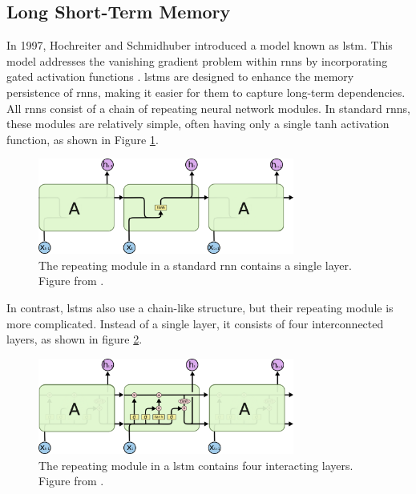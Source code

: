 \subsection{Long Short-Term Memory}
\label{sub:LSTM}

In 1997, Hochreiter and Schmidhuber introduced a model known as \gls{lstm}. This model addresses the vanishing gradient problem within \glspl{rnn} by incorporating gated activation functions \citep{hochreiter1997long}.
\newline
\newline
\glspl{lstm} are designed to enhance the memory persistence of \glspl{rnn}, making it easier for them to capture long-term dependencies. All \glspl{rnn} consist of a chain of repeating neural network modules. In standard \glspl{rnn}, these modules are relatively simple, often having only a single \gls{tanh} activation function, as shown in Figure \ref{fig:repeating_modules_rnn}.

\begin{figure}[ht]
    \centering
    \includegraphics[width=0.75\textwidth]{./assets/img/repeating_modules_rnn.png}
    \caption{The repeating module in a standard \gls{rnn} contains a single layer. Figure from \cite{Olah_2015}.}
    \label{fig:repeating_modules_rnn}
\end{figure}

\noindent
In contrast, \glspl{lstm} also use a chain-like structure, but their repeating module is more complicated. Instead of a single layer, it consists of four interconnected layers, as shown in figure \ref{fig:repeating_modules_lstm}.

\begin{figure}[ht]
    \centering
    \includegraphics[width=0.75\textwidth]{./assets/img/repeating_modules_lstm.png}
    \caption{The repeating module in a \gls{lstm} contains four interacting layers. Figure from \cite{Olah_2015}.}
    \label{fig:repeating_modules_lstm}
\end{figure}

